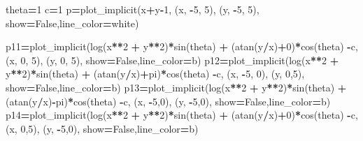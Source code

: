 \documentclass[
]{book}
\newenvironment{Shaded}{\begin{snugshade}}{\end{snugshade}}
\newcommand{\DecValTok}[1]{\textcolor[rgb]{0.00,0.00,0.81}{#1}}
\newcommand{\NormalTok}[1]{#1}
\newcommand{\OperatorTok}[1]{\textcolor[rgb]{0.81,0.36,0.00}{\textbf{#1}}}
\newcommand{\StringTok}[1]{\textcolor[rgb]{0.31,0.60,0.02}{#1}}
\newcommand{\VariableTok}[1]{\textcolor[rgb]{0.00,0.00,0.00}{#1}}
\theoremstyle{definition}
\theoremstyle{definition}
\theoremstyle{definition}
\theoremstyle{definition}
\theoremstyle{remark}
\begin{document}
\begin{Shaded}
\begin{Highlighting}[]
\NormalTok{theta}\OperatorTok{=}\DecValTok{1}
\NormalTok{c}\OperatorTok{=}\DecValTok{1}
\NormalTok{p}\OperatorTok{=}\NormalTok{plot\_implicit(x}\OperatorTok{+}\NormalTok{y}\OperatorTok{{-}}\DecValTok{1}\NormalTok{,}
\NormalTok{(x, }\OperatorTok{{-}}\DecValTok{5}\NormalTok{, }\DecValTok{5}\NormalTok{), (y, }\OperatorTok{{-}}\DecValTok{5}\NormalTok{, }\DecValTok{5}\NormalTok{), show}\OperatorTok{=}\VariableTok{False}\NormalTok{,line\_color}\OperatorTok{=}\StringTok{\textquotesingle{}white\textquotesingle{}}\NormalTok{)}

\NormalTok{p11}\OperatorTok{=}\NormalTok{plot\_implicit(log(x}\OperatorTok{**}\DecValTok{2} \OperatorTok{+}\NormalTok{ y}\OperatorTok{**}\DecValTok{2}\NormalTok{)}\OperatorTok{*}\NormalTok{sin(theta) }\OperatorTok{+}\NormalTok{ (atan(y}\OperatorTok{/}\NormalTok{x)}\OperatorTok{+}\DecValTok{0}\NormalTok{)}\OperatorTok{*}\NormalTok{cos(theta) }\OperatorTok{{-}}\NormalTok{c,}
\NormalTok{(x, }\DecValTok{0}\NormalTok{, }\DecValTok{5}\NormalTok{), (y, }\DecValTok{0}\NormalTok{, }\DecValTok{5}\NormalTok{), show}\OperatorTok{=}\VariableTok{False}\NormalTok{,line\_color}\OperatorTok{=}\StringTok{\textquotesingle{}b\textquotesingle{}}\NormalTok{)}
\NormalTok{p12}\OperatorTok{=}\NormalTok{plot\_implicit(log(x}\OperatorTok{**}\DecValTok{2} \OperatorTok{+}\NormalTok{ y}\OperatorTok{**}\DecValTok{2}\NormalTok{)}\OperatorTok{*}\NormalTok{sin(theta) }\OperatorTok{+}\NormalTok{ (atan(y}\OperatorTok{/}\NormalTok{x)}\OperatorTok{+}\NormalTok{pi)}\OperatorTok{*}\NormalTok{cos(theta) }\OperatorTok{{-}}\NormalTok{c,}
\NormalTok{(x, }\OperatorTok{{-}}\DecValTok{5}\NormalTok{, }\DecValTok{0}\NormalTok{), (y, }\DecValTok{0}\NormalTok{,}\DecValTok{5}\NormalTok{), show}\OperatorTok{=}\VariableTok{False}\NormalTok{,line\_color}\OperatorTok{=}\StringTok{\textquotesingle{}b\textquotesingle{}}\NormalTok{)}
\NormalTok{p13}\OperatorTok{=}\NormalTok{plot\_implicit(log(x}\OperatorTok{**}\DecValTok{2} \OperatorTok{+}\NormalTok{ y}\OperatorTok{**}\DecValTok{2}\NormalTok{)}\OperatorTok{*}\NormalTok{sin(theta) }\OperatorTok{+}\NormalTok{ (atan(y}\OperatorTok{/}\NormalTok{x)}\OperatorTok{{-}}\NormalTok{pi)}\OperatorTok{*}\NormalTok{cos(theta) }\OperatorTok{{-}}\NormalTok{c,}
\NormalTok{(x,  }\OperatorTok{{-}}\DecValTok{5}\NormalTok{,}\DecValTok{0}\NormalTok{), (y, }\OperatorTok{{-}}\DecValTok{5}\NormalTok{,}\DecValTok{0}\NormalTok{), show}\OperatorTok{=}\VariableTok{False}\NormalTok{,line\_color}\OperatorTok{=}\StringTok{\textquotesingle{}b\textquotesingle{}}\NormalTok{)}
\NormalTok{p14}\OperatorTok{=}\NormalTok{plot\_implicit(log(x}\OperatorTok{**}\DecValTok{2} \OperatorTok{+}\NormalTok{ y}\OperatorTok{**}\DecValTok{2}\NormalTok{)}\OperatorTok{*}\NormalTok{sin(theta) }\OperatorTok{+}\NormalTok{ (atan(y}\OperatorTok{/}\NormalTok{x)}\OperatorTok{+}\DecValTok{0}\NormalTok{)}\OperatorTok{*}\NormalTok{cos(theta) }\OperatorTok{{-}}\NormalTok{c,}
\NormalTok{(x, }\DecValTok{0}\NormalTok{,}\DecValTok{5}\NormalTok{), (y, }\OperatorTok{{-}}\DecValTok{5}\NormalTok{,}\DecValTok{0}\NormalTok{), show}\OperatorTok{=}\VariableTok{False}\NormalTok{,line\_color}\OperatorTok{=}\StringTok{\textquotesingle{}b\textquotesingle{}}\NormalTok{)}


\end{Highlighting}
\end{Shaded}
\end{document}
